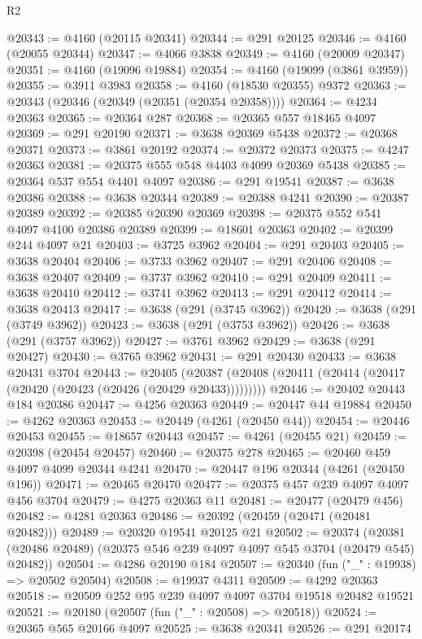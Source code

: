 \begin{lexlean}{R2}
\begin{coremodule}
@20343 := @4160 (@20115 @20341)
@20344 := @291 @20125
@20346 := @4160 (@20055 @20344)
@20347 := @4066 @3838
@20349 := @4160 (@20009 @20347)
@20351 := @4160 (@19096 @19884)
@20354 := @4160 (@19099 (@3861 @3959))
@20355 := @3911 @3983
@20358 := @4160 (@18530 @20355) @9372
@20363 := @20343 (@20346 (@20349 (@20351 (@20354 @20358))))
@20364 := @4234 @20363
@20365 := @20364 @287
@20368 := @20365 @557 @18465 @4097
@20369 := @291 @20190
@20371 := @3638 @20369 @5438
@20372 := @20368 @20371
@20373 := @3861 @20192
@20374 := @20372 @20373
@20375 := @4247 @20363
@20381 := @20375 @555 @548 @4403 @4099 @20369 @5438
@20385 := @20364 @537 @554 @4401 @4097
@20386 := @291 @19541
@20387 := @3638 @20386
@20388 := @3638 @20344
@20389 := @20388 @4241
@20390 := @20387 @20389
@20392 := @20385 @20390 @20369
@20398 := @20375 @552 @541 @4097 @4100 @20386 @20389
@20399 := @18601 @20363
@20402 := @20399 @244 @4097 @21
@20403 := @3725 @3962
@20404 := @291 @20403
@20405 := @3638 @20404
@20406 := @3733 @3962
@20407 := @291 @20406
@20408 := @3638 @20407
@20409 := @3737 @3962
@20410 := @291 @20409
@20411 := @3638 @20410
@20412 := @3741 @3962
@20413 := @291 @20412
@20414 := @3638 @20413
@20417 := @3638 (@291 (@3745 @3962))
@20420 := @3638 (@291 (@3749 @3962))
@20423 := @3638 (@291 (@3753 @3962))
@20426 := @3638 (@291 (@3757 @3962))
@20427 := @3761 @3962
@20429 := @3638 (@291 @20427)
@20430 := @3765 @3962
@20431 := @291 @20430
@20433 := @3638 @20431 @3704
@20443 := @20405
    (@20387 (@20408 (@20411 (@20414 (@20417 (@20420 (@20423 (@20426 (@20429 @20433)))))))))
@20446 := @20402 @20443 @184 @20386
@20447 := @4256 @20363
@20449 := @20447 @44 @19884
@20450 := @4262 @20363
@20453 := @20449 (@4261 (@20450 @44))
@20454 := @20446 @20453
@20455 := @18657 @20443
@20457 := @4261 (@20455 @21)
@20459 := @20398 (@20454 @20457)
@20460 := @20375 @278
@20465 := @20460 @459 @4097 @4099 @20344 @4241
@20470 := @20447 @196 @20344 (@4261 (@20450 @196))
@20471 := @20465 @20470
@20477 := @20375 @457 @239 @4097 @4097 @456 @3704
@20479 := @4275 @20363 @11
@20481 := @20477 (@20479 @456)
@20482 := @4281 @20363
@20486 := @20392 (@20459 (@20471 (@20481 @20482)))
@20489 := @20320 @19541 @20125 @21
@20502 := @20374
    (@20381 (@20486 @20489) (@20375 @546 @239 @4097 @4097 @545 @3704 (@20479 @545) @20482))
@20504 := @4286 @20190 @184
@20507 := @20340 (fun ("_" : @19938) => @20502 @20504)
@20508 := @19937 @4311
@20509 := @4292 @20363
@20518 := @20509 @252 @95 @239 @4097 @4097 @3704 @19518 @20482 @19521
@20521 := @20180 (@20507 (fun ("_" : @20508) => @20518))
@20524 := @20365 @565 @20166 @4097
@20525 := @3638 @20341
@20526 := @291 @20174

\end{coremodule}
\end{lexlean}
